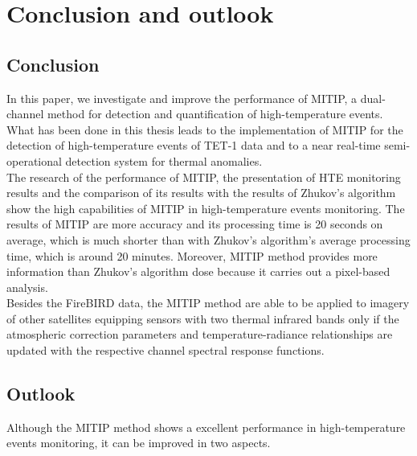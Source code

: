 \chapter{Conclusion and outlook}

\label{Chapter6}


\section{Conclusion}
In this paper, we investigate and improve the performance of MITIP, a dual-channel method for detection and quantification of high-temperature events. What has been done in this thesis leads to the implementation of MITIP for the detection of high-temperature events of TET-1 data and to a near real-time semi-operational detection system for thermal anomalies.\\

\noindent The research of the performance of MITIP, the presentation of HTE monitoring results and the comparison of its results with the results of Zhukov's algorithm show the high capabilities of MITIP in high-temperature events monitoring. The results of MITIP are more accuracy and its processing time is 20 seconds on average, which is much shorter than with Zhukov's algorithm's average processing time, which is around 20 minutes. Moreover, MITIP method provides more information than Zhukov's algorithm dose because it carries out a pixel-based analysis.\\

\noindent Besides the FireBIRD data, the MITIP method are able to be applied to imagery of other satellites equipping sensors with two thermal infrared bands only if the atmospheric correction parameters and temperature-radiance relationships are updated with the respective channel spectral response functions.\\


\section{Outlook}
Although the MITIP method shows a excellent performance in high-temperature events monitoring, it can be improved in two aspects.\\

